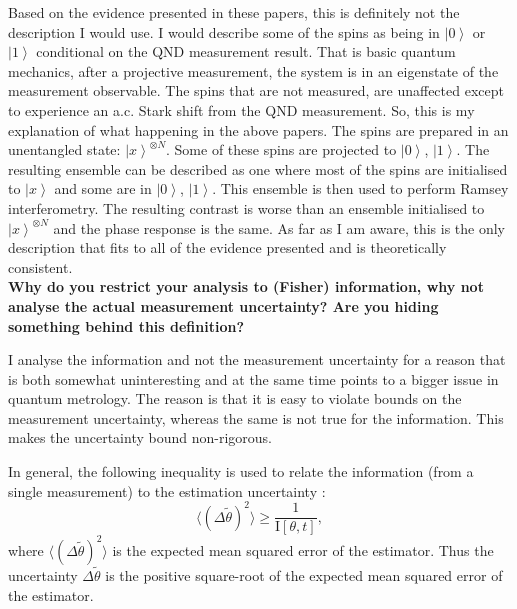 \documentclass[reqno]{amsart}
\def\be{\begin{equation}}
\def\ee{\end{equation}}
\def\est#1{\tilde{#1}}
\newcommand{\ket}[1]{\left| #1 \right>}
\def\func#1#2{\mathrm{#1}\left[#2\right]}
\begin{document}
Based on the evidence presented in these papers, this is definitely not the description I would use. I would describe some of the spins as being in $\ket{0}$ or $\ket{1}$ conditional on the QND measurement result. That is basic quantum mechanics, after a projective measurement, the system is in an eigenstate of the measurement observable. The spins that are not measured, are unaffected except to experience an a.c. Stark shift from the QND measurement. So, this is my explanation of what happening in the above papers. The spins are prepared in an unentangled state: $\ket{x}^{\otimes N}$. Some of these spins are projected to $\ket{0}$, $\ket{1}$. The resulting ensemble can be described as one where most of the spins are initialised to $\ket{x}$ and some are in $\ket{0}$, $\ket{1}$. This ensemble is then used to perform Ramsey interferometry. The resulting contrast is worse than an ensemble initialised to $\ket{x}^{\otimes N}$ and the phase response is the same. As far as I am aware, this is the only description that fits to all of the evidence presented and is theoretically consistent.\\

\noindent\textbf{Why do you restrict your analysis to (Fisher) information, why not analyse the actual measurement uncertainty? Are you hiding something behind this definition?}

I analyse the information and not the measurement uncertainty for a reason that is both somewhat uninteresting and at the same time points to a bigger issue in quantum metrology. The reason is that it is easy to violate bounds on the measurement uncertainty, whereas the same is not true for the information. This makes the uncertainty bound non-rigorous.

In general, the following inequality is used to relate the information (from a single measurement) to the estimation uncertainty \cite{Braunstein1996, Giovannetti2004, Giovannetti2006, DemkowiczDobrzanski2012, Pang2014, Yuan2015, Pang2017}:
\be
\langle (\Delta \est{\theta})^2\rangle \ge \frac{1}{\func{I}{\theta,t}},
\label{eq:info}
\ee
where $\langle (\Delta \est{\theta})^2\rangle$ is the expected mean squared error of the estimator. Thus the uncertainty $\Delta \est{\theta}$ is the positive square-root of the expected mean squared error of the estimator.
\end{document}
